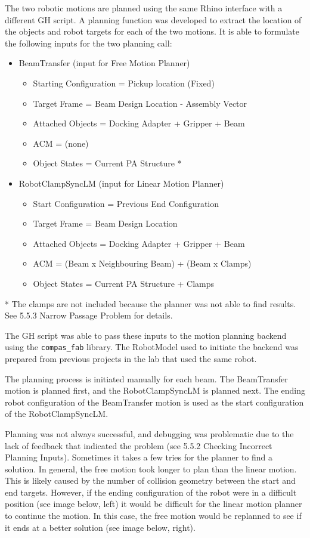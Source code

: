 The two robotic motions are planned using the same Rhino interface with a different GH script. A planning function was developed to extract the location of the objects and robot targets for each of the two motions. It is able to formulate the following inputs for the two planning call:
\begin{itemize}
    \item BeamTransfer (input for Free Motion Planner)
    \begin{itemize}
        \item Starting Configuration = Pickup location (Fixed)
        \item Target Frame = Beam Design Location - Assembly Vector
        \item Attached Objects = Docking Adapter + Gripper + Beam
        \item ACM = (none)
        \item Object States = Current PA Structure *
    \end{itemize}
    \item RobotClampSyncLM (input for Linear Motion Planner)
    \begin{itemize}
        \item Start Configuration = Previous End Configuration
        \item Target Frame = Beam Design Location
        \item Attached Objects = Docking Adapter + Gripper + Beam
        \item ACM = (Beam x Neighbouring Beam) + (Beam x Clamps)
        \item Object States = Current PA Structure + Clamps
    \end{itemize}
\end{itemize}
* The clamps are not included because the planner was not able to find results. See 5.5.3 Narrow Passage Problem for details.

The GH script was able to pass these inputs to the motion planning backend using the \verb|compas_fab| library. The RobotModel used to initiate the backend was prepared from previous projects in the lab that used the same robot. 

The planning process is initiated manually for each beam. The BeamTransfer motion is planned first, and the RobotClampSyncLM is planned next. The ending robot configuration of the BeamTransfer motion is used as the start configuration of the RobotClampSyncLM.

Planning was not always successful, and debugging was problematic due to the lack of feedback that indicated the problem (see 5.5.2 Checking Incorrect Planning Inputs). Sometimes it takes a few tries for the planner to find a solution. In general, the free motion took longer to plan than the linear motion. This is likely caused by the number of collision geometry between the start and end targets. However, if the ending configuration of the robot were in a difficult position (see image below, left) it would be difficult for the linear motion planner to continue the motion. In this case, the free motion would be replanned to see if it ends at a better solution (see image below, right).

